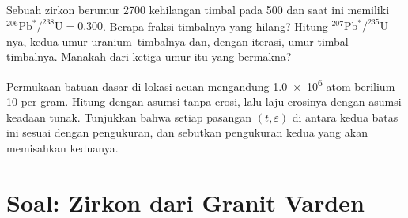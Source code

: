 \begin{exercise}[$\star\star\star$]\label{exo:b3:advanced-geochronology:11}
Sebuah zirkon berumur \qty{2700}{\Ma} kehilangan timbal pada \qty{500}{\Ma} dan saat ini memiliki
$^{206}\mathrm{Pb}^*/^{238}\mathrm{U} = 0.300$. Berapa fraksi timbalnya yang
hilang? Hitung $^{207}\mathrm{Pb}^*/^{235}\mathrm{U}$-nya, kedua umur uranium--timbalnya
dan, dengan iterasi, umur timbal--timbalnya. Manakah dari ketiga umur itu yang
bermakna?
\end{exercise}

\begin{exercise}[$\star\star\star$]\label{exo:b3:advanced-geochronology:12}
Permukaan batuan dasar di lokasi acuan mengandung \num{1.0e6} atom
berilium-10 per gram. Hitung  dengan asumsi tanpa erosi, lalu
laju erosinya dengan asumsi keadaan tunak. Tunjukkan bahwa setiap pasangan $(t, \varepsilon)$
di antara kedua batas ini sesuai dengan pengukuran, dan sebutkan pengukuran kedua
yang akan memisahkan keduanya.
\end{exercise}

\section{Soal: Zirkon dari Granit Varden}

